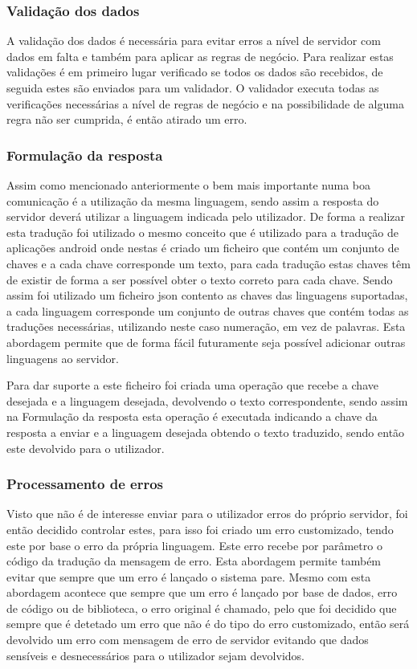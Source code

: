 \subsubsection{Validação dos dados}
A validação dos dados é necessária para evitar erros a nível de servidor com dados em falta e também para aplicar as regras de negócio. Para realizar estas validações é em primeiro lugar verificado se todos os dados são recebidos, de seguida estes são enviados para um validador. O validador executa todas as verificações necessárias a nível de regras de negócio e na possibilidade de alguma regra não ser cumprida, é então atirado um erro.

\subsubsection{Formulação da resposta}
Assim como mencionado anteriormente o bem mais importante numa boa comunicação é a utilização da mesma linguagem, sendo assim a resposta do servidor deverá  utilizar a linguagem indicada pelo utilizador. De forma a realizar esta tradução foi utilizado o mesmo conceito que é utilizado para a tradução de aplicações android onde nestas é criado um ficheiro que contém um conjunto de chaves e a cada chave corresponde um texto, para cada tradução estas chaves têm de existir de forma a ser possível obter o texto correto para cada chave. Sendo assim foi utilizado um ficheiro json contento as chaves das linguagens suportadas, a cada linguagem corresponde um conjunto de outras chaves que contém todas as traduções necessárias, utilizando neste caso numeração, em vez de palavras. Esta abordagem permite que de forma fácil futuramente seja possível adicionar outras linguagens ao servidor.


Para dar suporte a este ficheiro foi criada uma operação que recebe a chave desejada e a linguagem desejada, devolvendo o texto correspondente, sendo assim na Formulação da resposta esta operação é executada indicando a chave da resposta a enviar e a linguagem desejada obtendo o texto traduzido, sendo então este devolvido para o utilizador.

\newpage

\subsubsection{Processamento de erros}
Visto que não é de interesse enviar para o utilizador erros do próprio servidor, foi então decidido controlar estes, para isso foi criado um erro customizado, tendo este por base o erro da própria linguagem. Este erro recebe por parâmetro o código da tradução da mensagem de erro. Esta abordagem permite também evitar que sempre que um erro é lançado o sistema pare. Mesmo com esta abordagem acontece que sempre que um erro é lançado por base de dados, erro de código ou de biblioteca, o erro original é chamado, pelo que foi decidido que sempre que é detetado um erro que não é do tipo do erro customizado, então será devolvido um erro com mensagem de erro de servidor evitando que dados sensíveis e desnecessários para o utilizador sejam devolvidos.